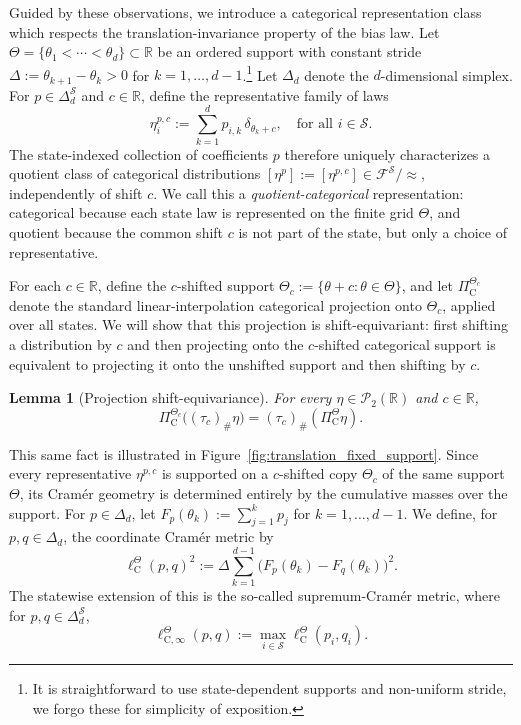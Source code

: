 \documentclass{article}
\newtheorem{lemma}[theorem]{Lemma}
\newcommand{\X}{\mathcal{S}}
\newcommand{\R}{\mathbb{R}}
\begin{document}
Guided by these observations, we introduce a categorical representation class which respects the translation-invariance property of the bias law. Let $\Theta = \{ \theta_1 < \cdots < \theta_d\} \subset \R$ be an ordered support with constant stride $\Delta:=\theta_{k+1} - \theta_k >0$ for $k=1,\dots, d-1$.\footnote{It is straightforward to use state-dependent supports and non-uniform stride, we forgo these for simplicity of exposition.} Let $\Delta_d$ denote the $d$-dimensional simplex. For $p \in \Delta^\X_d$ and $c \in \R$, define the representative family of laws
\begin{equation}
\eta_i^{p, c} := \sum_{k=1}^d p_{i, k}\, \delta_{\theta_k +c},\quad \text{for all } i \in \X.
\end{equation}
The state-indexed collection of coefficients $p$ therefore uniquely characterizes a quotient class of categorical distributions $[\eta^p] := [\eta^{p, c}] \in \mathcal F^\X / \approx$, independently of shift $c$. We call this a \emph{quotient-categorical} representation: categorical because
each state law is represented on the finite grid $\Theta$, and quotient because
the common shift $c$ is not part of the state, but only a choice of representative.

For each $c \in \R$, define the $c$-shifted support $\Theta_c := \{\theta +c : \theta \in \Theta\}$, and let $\Pi^{\Theta_c}_{\mathrm C}$ denote the standard linear-interpolation categorical projection \citep{bellemare2017distributional} onto $\Theta_c$, applied over all states. We will show that this projection is shift-equivariant: first shifting a distribution by $c$ and then projecting onto the $c$-shifted categorical support is equivalent to projecting it onto the unshifted support and then shifting by $c$.
\begin{lemma}[Projection shift-equivariance]\label{lem:proj-shift-equiv}
For every $\eta \in \mathcal P_2(\R)$ and $c \in \R$,
\begin{equation}
\Pi^{\Theta_c}_{\mathrm C} \bigl( (\tau_c)_\# \eta \bigr) = (\tau_c)_\# (\Pi^{\Theta}_{\mathrm C} \eta).
\end{equation}
\end{lemma}
This same fact is illustrated in Figure~\ref{fig:translation_fixed_support}. Since every representative $\eta^{p, c}$ is supported on a $c$-shifted copy $\Theta_c$ of the same support $\Theta$, its Cram\'er geometry is determined entirely by the cumulative masses over the support. For $p \in \Delta_d$, let $F_p(\theta_k) := \sum_{j=1}^k p_j$ for $ k=1,\dots,d-1$. We define, for $p, q \in \Delta_d$, the coordinate Cram\'er metric by
\begin{equation}
\ell^\Theta_{\mathrm C}(p, q)^2 := \Delta \sum_{k=1}^{d-1}\bigl(F_p(\theta_k) - F_q(\theta_k)\bigr)^2.
\end{equation}
The statewise extension of this is the so-called supremum-Cram\'er metric, where for $p, q \in \Delta^\X_d$,
\begin{equation}
\ell^\Theta_{\mathrm C, \infty}(p, q) := \max_{i \in \X}\ell^\Theta_{\mathrm C}(p_i, q_i).
\end{equation}
\end{document}
